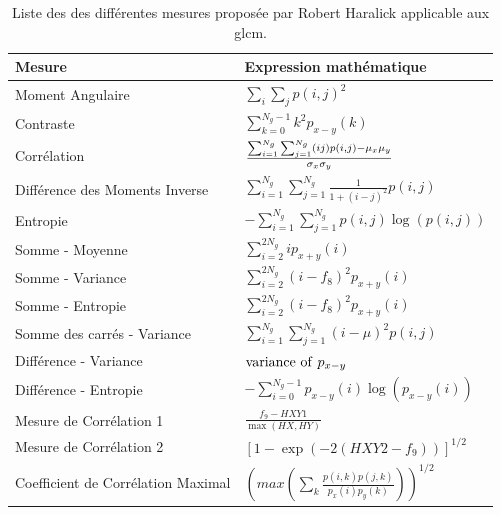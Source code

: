 \begin{table}[H]
    \centering
    \begin{tabular}{ll}
        \toprule
        \textbf{Mesure}                     & \textbf{Expression mathématique}                                                              \\ \hline
        Moment Angulaire                    & $ \sum_i\sum_jp(i,j)^2$                                                                       \\
        Contraste                           & $\sum_{k=0}^{N_g-1} k^2 p_{x-y}(k)$                                                           \\
        Corrélation                         & $\frac{\Large{\sum_{i=1}^{N_g}\sum_{j=1}^{N_g}} (ij)p(i,j) - \mu_x\mu_y}{\sigma_x\sigma_y}$   \\
        Différence des Moments Inverse      & $\sum_{i=1}^{N_g}\sum_{j=1}^{N_g} \frac{1}{1 + (i - j)^2} p(i,j)$                             \\   
        Entropie                            & $-\sum_{i=1}^{N_g}\sum_{j=1}^{N_g} p(i,j) \log(p(i,j))$                                       \\   
        Somme - Moyenne                     & $\sum_{i=2}^{2N_g} i p_{x+y}(i)$                                                              \\    
        Somme - Variance                    & $\sum_{i=2}^{2N_g} (i - f_8)^2 p_{x+y}(i)$                                                    \\    
        Somme - Entropie                    & $\sum_{i=2}^{2N_g} (i - f_8)^2 p_{x+y}(i)$                                                    \\    
        Somme des carrés - Variance         & $\sum_{i=1}^{N_g}\sum_{j=1}^{N_g} (i - \mu)^2 p(i,j)$                                         \\   
        Différence - Variance               & ${\rm variance \ of ~} p_{x-y}$                                                               \\    
        Différence - Entropie               & $-\sum_{i=0}^{N_g-1} p_{x-y}(i) \log(p_{x-y}(i))$                                             \\
        Mesure de Corrélation 1             & $\frac{f_9 - HXY1}{\max(HX,HY)}$                                                              \\  
        Mesure de Corrélation 2             & $[1 - \exp(-2(HXY2 - f_9))]^{1/2}$                                                            \\ 
        Coefficient de Corrélation Maximal  & $(max(\sum_k \frac{p(i,k)p(j,k)}{p_x(i)p_y(k)}))^{1/2}$                                       \\ 
        \bottomrule
    \end{tabular}
    \caption{Liste des des différentes mesures proposée par Robert Haralick applicable aux \gls{glcm}.}
    \label{tab:haralick_descriptors}
\end{table}\par
 
